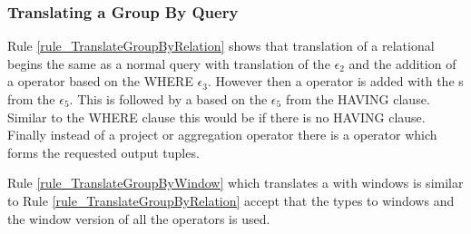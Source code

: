\subsubsection{Translating a Group By Query}
Rule \ref{rule_TranslateGroupByRelation} shows that translation of a relational  begins the same as a normal query with translation of the  $\epsilon_2$ and the addition of a  operator based on the WHERE  $\epsilon_3$.
However then a  operator is added with the s from the  $\epsilon_5$.
This is followed by a  based on the  $\epsilon_5$ from the HAVING clause.
Similar to the WHERE clause this would be  if there is no HAVING clause.
Finally instead of a project or aggregation operator there is a  operator which forms the requested output tuples.


Rule \ref{rule_TranslateGroupByWindow} which translates a  with windows is similar to Rule \ref{rule_TranslateGroupByRelation} accept that the  types to windows and the window version of all the operators is used.


